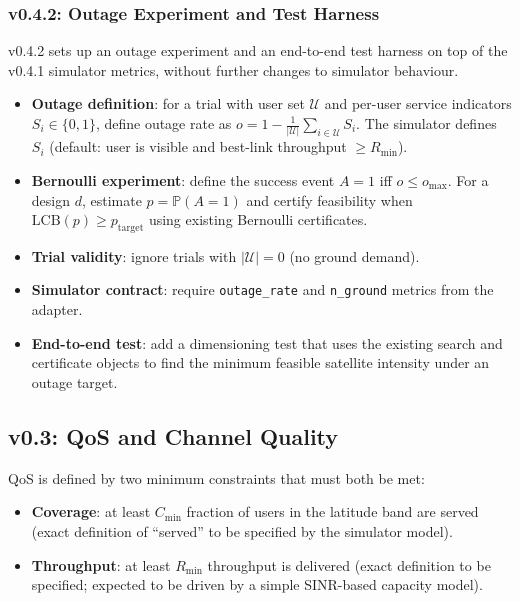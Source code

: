 \documentclass[11pt,a4paper]{article}
\begin{document}
\subsubsection{v0.4.2: Outage Experiment and Test Harness}
v0.4.2 sets up an outage experiment and an end-to-end test harness on top of the v0.4.1 simulator
metrics, without further changes to simulator behaviour.
\begin{itemize}
    \item \textbf{Outage definition}: for a trial with user set $\mathcal{U}$ and per-user service indicators
    $S_i \in \{0,1\}$, define outage rate as
    $o = 1 - \frac{1}{|\mathcal{U}|} \sum_{i \in \mathcal{U}} S_i$.
    The simulator defines $S_i$ (default: user is visible and best-link throughput $\ge R_{\min}$).
    \item \textbf{Bernoulli experiment}: define the success event $A=1$ iff $o \le o_{\max}$.
    For a design $d$, estimate $p = \mathbb{P}(A=1)$ and certify feasibility when
    $\mathrm{LCB}(p) \ge p_{\mathrm{target}}$ using existing Bernoulli certificates.
    \item \textbf{Trial validity}: ignore trials with $|\mathcal{U}|=0$ (no ground demand).
    \item \textbf{Simulator contract}: require \texttt{outage\_rate} and \texttt{n\_ground} metrics from
    the adapter.
    \item \textbf{End-to-end test}: add a dimensioning test that uses the existing search and certificate
    objects to find the minimum feasible satellite intensity under an outage target.
\end{itemize}

\subsection{v0.3: QoS and Channel Quality}
QoS is defined by two minimum constraints that must both be met:
\begin{itemize}
    \item \textbf{Coverage}: at least $C_{\min}$ fraction of users in the latitude band are served (exact definition of
    ``served'' to be specified by the simulator model).
    \item \textbf{Throughput}: at least $R_{\min}$ throughput is delivered (exact definition to be specified; expected to be
    driven by a simple SINR-based capacity model).
\end{itemize}
\end{document}
